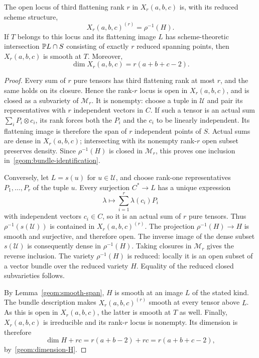 \begin{lemma}\label{geom:flattening-bundle}
The open locus of third flattening rank $r$ in $X_r(a,b,c)$ is,
with its reduced scheme structure,
\begin{equation}\label{geom:bundle-identification}
 X_r(a,b,c)^{(r)}=\rho^{-1}(H).
\end{equation}
If $T$ belongs to this locus and its flattening image $L$ has
scheme-theoretic intersection $\mathbb P L\cap S$ consisting of exactly
$r$ reduced spanning points, then $X_r(a,b,c)$ is smooth at $T$.
Moreover,
\begin{equation}\label{geom:dimension-X}
 \dim X_r(a,b,c)=r(a+b+c-2).
\end{equation}
\end{lemma}

\begin{proof}
Every sum of $r$ pure tensors has third flattening rank at most
$r$, and the same holds on its closure. Hence the rank-$r$ locus
is open in $X_r(a,b,c)$, and is closed as a subvariety of
$\mathcal M_r$. It is nonempty: choose a tuple in $\mathcal U$
and pair its representatives with $r$ independent vectors in $C$.
If such a tensor is an actual sum
$\sum_i P_i\otimes c_i$, its rank forces both the $P_i$ and the
$c_i$ to be linearly independent. Its flattening image is therefore
the span of $r$ independent points of $S$. Actual sums are dense in
$X_r(a,b,c)$; intersecting with its nonempty rank-$r$ open subset
preserves density. Since $\rho^{-1}(H)$ is closed in $\mathcal M_r$,
this proves one inclusion in~\eqref{geom:bundle-identification}.

Conversely, let $L=s(u)$ for $u\in\mathcal U$, and choose rank-one
representatives $P_1,\ldots,P_r$ of the tuple $u$. Every surjection
$C^*\to L$ has a unique expression
\[
 \lambda\longmapsto\sum_{i=1}^r\lambda(c_i)P_i
\]
with independent vectors $c_i\in C$, so it is an actual sum of
$r$ pure tensors. Thus $\rho^{-1}(s(\mathcal U))$ is contained in
$X_r(a,b,c)^{(r)}$. The projection $\rho^{-1}(H)\to H$ is smooth
and surjective, and therefore open. The inverse image of the dense
subset $s(\mathcal U)$ is consequently dense in $\rho^{-1}(H)$.
Taking closures in $\mathcal M_r$ gives the reverse inclusion.
The variety $\rho^{-1}(H)$ is reduced: locally it is an open
subset of a vector bundle over the reduced variety $H$.
Equality of the reduced closed subvarieties follows.

By Lemma~\ref{geom:smooth-span}, $H$ is smooth at an image $L$
of the stated kind. The bundle description makes
$X_r(a,b,c)^{(r)}$ smooth at every tensor above $L$. As this is
open in $X_r(a,b,c)$, the latter is smooth at $T$ as well.
Finally, $X_r(a,b,c)$ is irreducible and its rank-$r$ locus is
nonempty. Its dimension is therefore
\[
 \dim H+rc=r(a+b-2)+rc=r(a+b+c-2),
\]
by~\eqref{geom:dimension-H}.
\end{proof}

